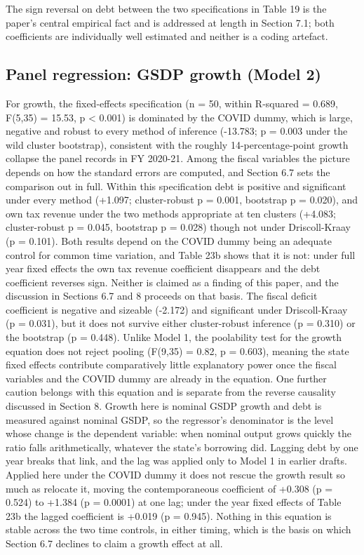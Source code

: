 \documentclass[12pt,a4paper]{article}
\begin{document}
The sign reversal on debt between the two specifications in Table 19 is the paper's central empirical fact and is addressed at length in Section 7.1; both coefficients are individually well estimated and neither is a coding artefact.

\subsection{Panel regression: GSDP growth (Model 2)}

For growth, the fixed-effects specification (n = 50, within R-squared = 0.689, F(5,35) = 15.53, p < 0.001) is dominated by the COVID dummy, which is large, negative and robust to every method of inference (-13.783; p = 0.003 under the wild cluster bootstrap), consistent with the roughly 14-percentage-point growth collapse the panel records in FY 2020-21. Among the fiscal variables the picture depends on how the standard errors are computed, and Section 6.7 sets the comparison out in full. Within this specification debt is positive and significant under every method (+1.097; cluster-robust p = 0.001, bootstrap p = 0.020), and own tax revenue under the two methods appropriate at ten clusters (+4.083; cluster-robust p = 0.045, bootstrap p = 0.028) though not under Driscoll-Kraay (p = 0.101). Both results depend on the COVID dummy being an adequate control for common time variation, and Table 23b shows that it is not: under full year fixed effects the own tax revenue coefficient disappears and the debt coefficient reverses sign. Neither is claimed as a finding of this paper, and the discussion in Sections 6.7 and 8 proceeds on that basis. The fiscal deficit coefficient is negative and sizeable (-2.172) and significant under Driscoll-Kraay (p = 0.031), but it does not survive either cluster-robust inference (p = 0.310) or the bootstrap (p = 0.448). Unlike Model 1, the poolability test for the growth equation does not reject pooling (F(9,35) = 0.82, p = 0.603), meaning the state fixed effects contribute comparatively little explanatory power once the fiscal variables and the COVID dummy are already in the equation. One further caution belongs with this equation and is separate from the reverse causality discussed in Section 8. Growth here is nominal GSDP growth and debt is measured against nominal GSDP, so the regressor's denominator is the level whose change is the dependent variable: when nominal output grows quickly the ratio falls arithmetically, whatever the state's borrowing did. Lagging debt by one year breaks that link, and the lag was applied only to Model 1 in earlier drafts. Applied here under the COVID dummy it does not rescue the growth result so much as relocate it, moving the contemporaneous coefficient of +0.308 (p = 0.524) to +1.384 (p = 0.0001) at one lag; under the year fixed effects of Table 23b the lagged coefficient is +0.019 (p = 0.945). Nothing in this equation is stable across the two time controls, in either timing, which is the basis on which Section 6.7 declines to claim a growth effect at all.
\end{document}
